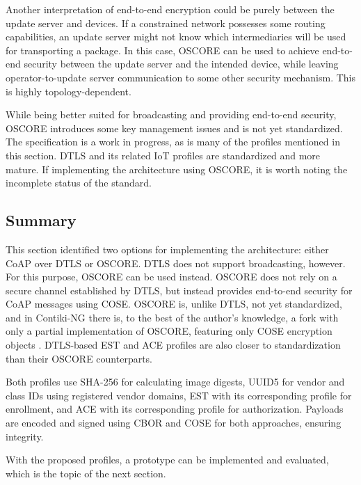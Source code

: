 \documentclass[0-thesis.tex]{subfiles}
\begin{document}
Another interpretation of end-to-end encryption could be purely between the update server
and devices. If a constrained network possesses some routing capabilities, an update
server might not know which intermediaries will be used for transporting a package. In
this case, OSCORE can be used to achieve end-to-end security between the update server and
the intended device, while leaving operator-to-update server communication to some other
security mechanism. This is highly topology-dependent.

While being better suited for broadcasting and providing end-to-end security, OSCORE
introduces some key management issues and is not yet standardized. The specification
\parencite{oscore} is a work in progress, as is many of the profiles mentioned in this
section. DTLS and its related IoT profiles are standardized and more mature. If
implementing the architecture using OSCORE, it is worth noting the incomplete status of
the standard.

\subsection{Summary}
\label{ssec:profiles-summary}
This section identified two options for implementing the architecture: either CoAP over
DTLS or OSCORE. DTLS does not support broadcasting, however. For this purpose, OSCORE can
be used instead. OSCORE does not rely on a secure channel established by DTLS, but instead
provides end-to-end security for CoAP messages using COSE. OSCORE is, unlike DTLS, not yet
standardized, and in Contiki-NG there is, to the best of the author's knowledge, a fork
with only a partial implementation of OSCORE, featuring only COSE encryption objects
\parencite{contiki-oscore}. DTLS-based EST and ACE profiles are also closer to
standardization than their OSCORE counterparts.

Both profiles use SHA-256 for calculating image digests, UUID5 for vendor and class IDs
using registered vendor domains, EST with its corresponding profile for enrollment, and
ACE with its corresponding profile for authorization. Payloads are encoded and signed
using CBOR and COSE for both approaches, ensuring integrity.

With the proposed profiles, a prototype can be implemented and evaluated, which is the
topic of the next section.
\end{document}
